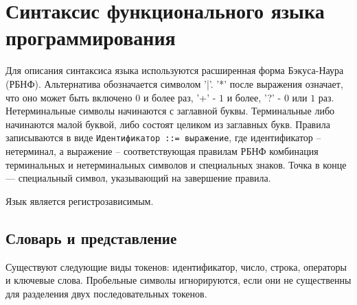 \section{Синтаксис функционального языка программирования}
    Для описания синтаксиса языка используются расширенная форма Бэкуса-Наура (РБНФ). 
    Альтернатива обозначается символом '|'. 
    '*' после выражения означает, что оно может быть включено $0$ и более раз, '+' - $1$ и более, '?' - $0$ или $1$ раз.\cite{skor}
    Нетерминальные символы начинаются с заглавной буквы. 
    Терминальные либо начинаются малой буквой, либо состоят целиком из заглавных букв.
    Правила записываются в виде \verb!Идентификатор ::= выражение!,
    где идентификатор -- нетерминал, а выражение -- соответствующая правилам РБНФ комбинация терминальных и нетерминальных символов и специальных знаков.
    Точка в конце — специальный символ, указывающий на завершение правила.

    Язык является регистрозависимым.

    \subsection{Словарь и представление}
        Существуют следующие виды токенов: идентификатор, число, строка, операторы и ключевые слова.
        Пробельные символы игнорируются, если они не существенны для разделения двух последовательных токенов.

